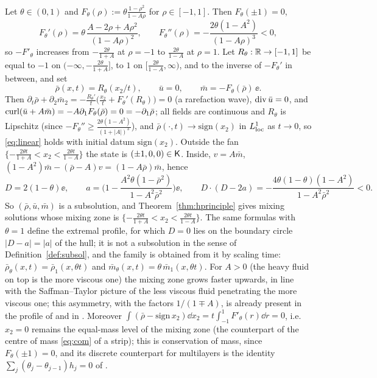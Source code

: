 \begin{example}\label{ex:flat}
Let $\theta\in(0,1)$ and $F_\theta(\rho):=\theta\frac{1-\rho^2}{1-A\rho}$ for $\rho\in[-1,1]$. Then $F_\theta(\pm1)=0$,
\[
F_\theta'(\rho)=\theta\,\frac{A-2\rho+A\rho^2}{(1-A\rho)^2},\qquad F_\theta''(\rho)=-\frac{2\theta(1-A^2)}{(1-A\rho)^3}<0,
\]
so $-F'_\theta$ increases from $-\frac{2\theta}{1+A}$ at $\rho=-1$ to $\frac{2\theta}{1-A}$ at $\rho=1$. Let $R_\theta:\mathbb{R}\to[-1,1]$ be equal to $-1$ on $(-\infty,-\frac{2\theta}{1+A}]$, to $1$ on
$[\frac{2\theta}{1-A},\infty)$, and to the inverse of $-F_\theta'$ in between, and set
\[
\bar\rho(x,t)=R_\theta(x_2/t),\qquad \bar u=0,\qquad \bar m=-F_\theta(\bar\rho)\,\ee .
\]
Then $\partial_t\bar\rho+\partial_2\bar m_2=-\frac{R_\theta'}{t}\big(\frac{x_2}{t}+F_\theta'(R_\theta)\big)=0$ (a rarefaction wave), $\operatorname{div}\bar u=0$, and $\operatorname{curl}(\bar u+A\bar m)=-A\partial_1F_\theta(\bar\rho)=0=-\partial_1\bar\rho$;
all fields are continuous and $R_\theta$ is Lipschitz (since $-F_\theta''\ge\frac{2\theta(1-A^2)}{(1+|A|)^3}$), and $\bar\rho(\cdot,t)\to\mathrm{sign}(x_2)$ in $L^1_{\rm loc}$ as
$t\to0$, so \eqref{eq:linear} holds with initial datum $\mathrm{sign}(x_2)$. Outside the fan $\{-\frac{2\theta t}{1+A}<x_2<\frac{2\theta t}{1-A}\}$ the state is $(\pm1,0,0)\in\mathsf{K}$. Inside, $v=A\bar m$,
$(1-A^2)\bar m-(\bar\rho-A)v=(1-A\bar\rho)\bar m$, hence
\[
D=2(1-\theta)\ee,\qquad a=\Big(1-\frac{A^2\theta(1-\bar\rho^2)}{1-A^2\bar\rho^2}\Big)\ee,\qquad D\cdot(D-2a)=-\frac{4\theta(1-\theta)(1-A^2)}{1-A^2\bar\rho^2}<0 .
\]
So $(\bar\rho,\bar u,\bar m)$ is a subsolution, and Theorem~\ref{thm:hprinciple} gives mixing solutions whose mixing zone is $\{-\frac{2\theta t}{1+A}<x_2<\frac{2\theta t}{1-A}\}$. The same
formulas with $\theta=1$ define the extremal profile, for which $D=0$ lies on the boundary circle $|D-a|=|a|$ of the hull; it is not a subsolution in the sense of
Definition~\ref{def:subsol}, and the family is obtained from it by scaling time: $\bar\rho_\theta(x,t)=\bar\rho_1(x,\theta t)$ and $\bar m_\theta(x,t)=\theta\,\bar m_1(x,\theta t)$. For
$A>0$ (the heavy fluid on top is the more viscous one) the mixing zone grows faster upwards, in line with the Saffman--Taylor picture \cite{ST58} of the less viscous fluid penetrating the
more viscous one; this asymmetry, with the factors $1/(1\mp A)$, is already present in the profile of \cite{Men22} and in \cite[Secs.~1.4 and~3.2]{LM26}. Moreover
$\int(\bar\rho-\mathrm{sign}\,x_2)\dd x_2=t\int_{-1}^1F'_\theta(r)\dd r=0$, i.e.\ $x_2=0$ remains the equal-mass level of the mixing zone (the counterpart of the centre of mass
\eqref{eq:com} of a strip); this is conservation of mass, since $F_\theta(\pm1)=0$, and its discrete counterpart for multilayers is the identity $\sum_j(\theta_j-\theta_{j-1})h_j=0$ of
\cite[Sec.~7.5]{LM26}.
\end{example}
